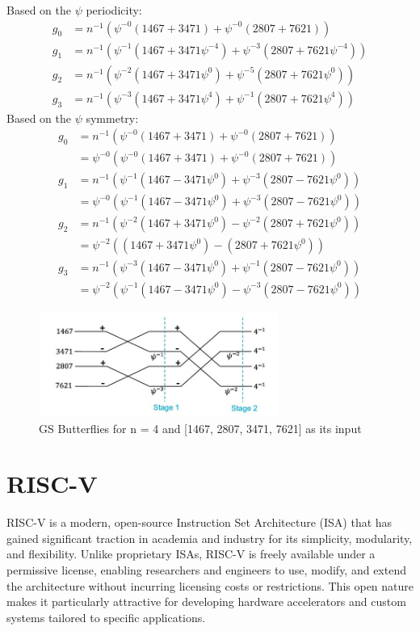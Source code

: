 \documentclass[12pt]{report}
\begin{document}
Based on the $\psi$ periodicity:
\begin{align*}
    g_0 &= n^{-1}(\psi^{-0}(1467 + 3471) + \psi^{-0}(2807 + 7621)) \\
    g_1 &= n^{-1}(\psi^{-1}(1467 + 3471\psi^{-4}) + \psi^{-3}(2807 + 7621\psi^{-4})) \\
    g_2 &= n^{-1}(\psi^{-2}(1467 + 3471\psi^{0}) + \psi^{-5}(2807 + 7621\psi^{0})) \\
    g_3 &= n^{-1}(\psi^{-3}(1467 + 3471\psi^{4}) + \psi^{-1}(2807 + 7621\psi^{4})) 
\end{align*}
Based on the $\psi$ symmetry:
\begin{align*}
    g_0 &= n^{-1}(\psi^{-0}(1467 + 3471) + \psi^{-0}(2807 + 7621)) \\
    &= \psi^{-0}(\psi^{-0}(1467 + 3471) + \psi^{-0}(2807 + 7621)) \\
    g_1 &= n^{-1}(\psi^{-1}(1467 - 3471\psi^{0}) + \psi^{-3}(2807 - 7621\psi^{0})) \\ &= \psi^{-0}(\psi^{-1}(1467 - 3471\psi^{0}) + \psi^{-3}(2807 - 7621\psi^{0})) \\
    g_2 &= n^{-1}(\psi^{-2}(1467 + 3471\psi^{0}) - \psi^{-2}(2807 + 7621\psi^{0})) \\ &= \psi^{-2}((1467 + 3471\psi^{0}) - (2807 + 7621\psi^{0})) \\
    g_3 &= n^{-1}(\psi^{-3}(1467 - 3471\psi^{0}) + \psi^{-1}(2807 - 7621\psi^{0})) \\ &= \psi^{-2}(\psi^{-1}(1467 - 3471\psi^{0}) - \psi^{-3}(2807 - 7621\psi^{0}))
\end{align*}
\begin{figure}[H]
    \centering
    \includegraphics[width=0.7\textwidth]{./ntt_figures/7.jpg}
    \caption{GS Butterflies for n = 4 and [1467, 2807, 3471, 7621] as its input}
\end{figure}

\chapter{RISC-V}

RISC-V is a modern, open-source Instruction Set Architecture (ISA) that has gained significant traction in academia and industry for its simplicity, modularity, and flexibility. Unlike proprietary ISAs, RISC-V is freely available under a permissive license, enabling researchers and engineers to use, modify, and extend the architecture without incurring licensing costs or restrictions. This open nature makes it particularly attractive for developing hardware accelerators and custom systems tailored to specific applications.
\end{document}
